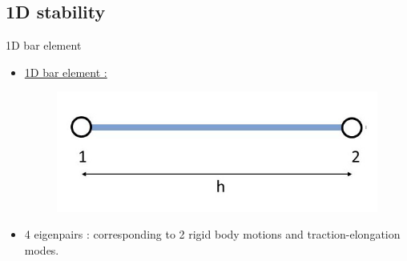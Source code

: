 \subsection{1D stability}
\begin{frame}{1D bar element}
\begin{itemize}
\item \underline{1D bar element :}
\begin{figure}
\centering
\includegraphics[width=0.5\linewidth]{images/bar-element.jpg}
\end{figure}
\item 4 eigenpairs : corresponding to 2 rigid body motions and traction-elongation modes. 
\end{itemize}
\end{frame}

